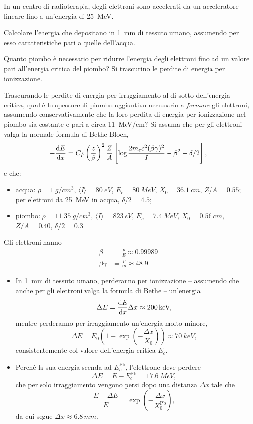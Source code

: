 \begin{Exercise}[title={Perdita di energia per ionizzazione}]
In un centro di radioterapia, degli elettroni sono accelerati da un acceleratore lineare fino a un'energia di \SI{25}{MeV}. 

\Question Calcolare l'energia che depositano in \SI{1}{mm} di tessuto umano, assumendo per esso caratteristiche pari a quelle dell'acqua.

\Question Quanto piombo è necessario per ridurre l'energia degli elettroni fino ad un valore pari all'energia critica del piombo? Si trascurino le perdite di energia per ionizzazione.

\Question Trascurando le perdite di energia per irraggiamento al di sotto dell'energia critica, qual è lo spessore di piombo aggiuntivo necessario a \emph{fermare} gli elettroni, assumendo conservativamente che la loro perdita di energia per ionizzazione nel piombo sia costante e pari a circa \SI{11}{MeV/cm}? Si assuma che per gli elettroni valga la normale formula di Bethe-Bloch,
\[
-\dv{E}{x} = C\rho\left(\frac{z}{\beta}\right)^2\frac{Z}{A}\left[\log\frac{2m_ec^2(\beta\gamma)^2}{I}-\beta^2-\delta/2\right],
\]
e che:
\begin{itemize}
    \item acqua: $\rho=\SI{1}{g/cm^3}$, $\langle I\rangle=\SI{80}{eV}$, $E_c=\SI{80}{MeV}$, $X_0=\SI{36.1}{cm}$, $Z/A=0.55$; per elettroni da \SI{25}{MeV} in acqua, $\delta/2=4.5$;
    \item piombo: $\rho=\SI{11.35}{g/cm^3}$, $\langle I \rangle=\SI{823}{eV}$, $E_c=\SI{7.4}{MeV}$, $X_0=\SI{0.56}{cm}$, $Z/A=0.40$, $\delta/2=0.3$.
\end{itemize}
\end{Exercise}
\begin{Answer}
Gli elettroni hanno
\begin{align*}
\beta&=\frac{p}{E}\approx0.99989\\
\beta\gamma&=\frac{p}{m}\approx48.9.
\end{align*}
\begin{itemize}
    \item In \SI{1}{mm} di tessuto umano, perderanno per ionizzazione -- assumendo che anche per gli elettroni valga la formula di Bethe -- un'energia
    \[
    \Delta E = \dv{E}{x}\Delta x  \approx \SI{200}{keV},
    \]
    mentre perderanno per irraggiamento un'energia molto minore,
    \[
    \Delta E = E_0\left(1-\exp(-\frac{\Delta x}{X_0})\right)\approx \SI{70}{keV},
    \]
    consistentemente col valore dell'energia critica $E_c$.

    \item Perché la sua energia scenda ad $E_c^\text{Pb}$, l'elettrone deve perdere
    \[
    \Delta E = E-E_c^\text{Pb} = \SI{17.6}{MeV},
    \]
    che per solo irraggiamento vengono persi dopo una distanza $\Delta x$ tale che
    \[
    \frac{E-\Delta E}{E} = \exp(-\frac{\Delta x}{X_0^\text{Pb}}),
    \]
    da cui segue $\Delta x \approx\SI{6.8}{mm}$.
\end{itemize}
\end{Answer}

